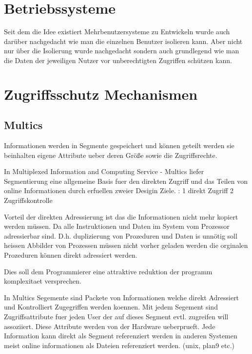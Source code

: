 \documentclass[9pt,technote]{IEEEtran}
\begin{document}
   \section{Betriebssysteme}
     Seit dem die Idee existiert Mehrbenutzersysteme zu Entwickeln wurde auch dar\"uber nachgedacht wie man die einzelnen Benutzer isolieren kann.
     Aber nicht nur \"uber die Isolierung wurde nachgedacht sondern auch grundlegend wie man die Daten 
     der jeweiligen Nutzer vor unberechtigten Zugriffen sch\"utzen kann.
     
  \section{Zugriffsschutz Mechanismen} \label{sec:protection}
  
   \subsection{Multics}  
   
   Informationen werden in Segmente gespeichert und k\"onnen geteilt werden sie beinhalten eigene Attribute 
   ueber deren Gr\"o\ss e sowie die Zugriffsrechte.
   
   In Multiplexed Information and Computing Service - Multics  liefer Segmentierung eine allgemeine Basis fuer den direkten Zugriff
   und das Teilen von online Informationen durch erfuellen zweier Desigin Ziele. : 1 direkt Zugriff 2 Zugriffskontrolle
   
   Vorteil der direkten Adressierung ist das die Informationen nicht mehr kopiert werden m\"ussen. Da alle Instruktionen und Daten
   im System vom Prozessor adressierbar sind. D.h. duplizierung von Prozeduren und Daten is unn\"otig soll heissen Abbilder von Prozessen m\"ussen
   nicht vorher geladen werden die orginalen Prozeduren k\"onnen direkt adressiert werden.
   
  Dies soll dem Programmierer eine attraktive reduktion der programm komplexitaet versprechen.
  
  In Multics Segemente sind Packete von Informationen welche direkt Adressiert und Kontrolliert Zugegriffen werden koennen.
  Mit jedem Segement sind Zugriffsattribute fuer jeden User der auf dieses Segment evtl. zugreifen will assoziiert.
  Diese Attribute werden von der Hardware ueberprueft. Jede Information kann direkt als Segment referenziert werden
  in anderen Systemen meist online informationen als Dateien referenziert werden. (unix, plan9 etc.)
  
\end{document}
